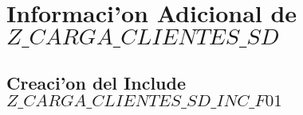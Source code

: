 \chapter{Informaci'on Adicional de $Z\_CARGA\_CLIENTES\_SD$}
\section{Creaci'on del Include $Z\_CARGA\_CLIENTES\_SD\_INC\_F01$}


